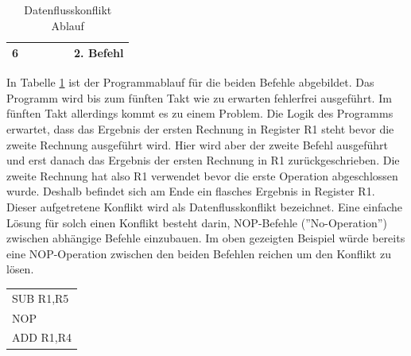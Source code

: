\documentclass[12pt]{article}
\begin{document}
\begin{table}[!htb]
\begin{tabular}{|c|c|c|c|c|c|}
6    &                                                            &                                                              &                                                               &                                           & 2. Befehl                                                       \\ \hline
\end{tabular}
\caption{Datenflusskonflikt Ablauf \protect\cite{mikroprozessortechnik2011}}
\label{tab:Datenflusskonflikt}
\end{table}

\noindent In Tabelle \ref{tab:Datenflusskonflikt} ist der Programmablauf für die beiden Befehle abgebildet. Das Programm wird bis zum fünften Takt wie zu erwarten fehlerfrei ausgeführt. Im fünften Takt allerdings kommt es zu einem Problem. Die Logik des Programms erwartet, dass das Ergebnis der ersten Rechnung in Register R1 steht bevor die zweite Rechnung ausgeführt wird. Hier wird aber der zweite Befehl ausgeführt und erst danach das Ergebnis der ersten Rechnung in R1 zurückgeschrieben. Die zweite Rechnung hat also R1 verwendet bevor die erste Operation abgeschlossen wurde. Deshalb befindet sich am Ende ein flasches Ergebnis in Register R1. Dieser aufgetretene Konflikt wird als Datenflusskonflikt bezeichnet. Eine einfache Lösung für solch einen Konflikt besteht darin, NOP-Befehle (''No-Operation'') zwischen abhängige Befehle einzubauen. Im oben gezeigten Beispiel würde bereits eine NOP-Operation zwischen den beiden Befehlen reichen um den Konflikt zu lösen.


\begin{table}[!htb]
\centering
\begin{tabular}{l}
SUB R1,R5 \\
NOP       \\
ADD R1,R4
\end{tabular}
\end{table}
\end{document}
